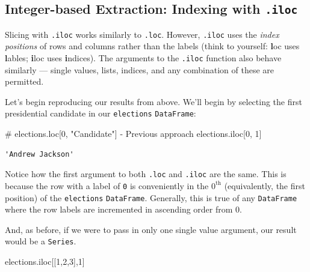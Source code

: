 \documentclass[
  letterpaper,
  DIV=11,
  numbers=noendperiod]{scrreprt}
\newenvironment{Shaded}{\begin{snugshade}}{\end{snugshade}}
\newcommand{\CommentTok}[1]{\textcolor[rgb]{0.37,0.37,0.37}{#1}}
\newcommand{\DecValTok}[1]{\textcolor[rgb]{0.68,0.00,0.00}{#1}}
\newcommand{\NormalTok}[1]{\textcolor[rgb]{0.00,0.23,0.31}{#1}}
\begin{document}
\hypertarget{integer-based-extraction-indexing-with-.iloc}{%
\subsection{\texorpdfstring{Integer-based Extraction: Indexing with
\texttt{.iloc}}{Integer-based Extraction: Indexing with .iloc}}\label{integer-based-extraction-indexing-with-.iloc}}

Slicing with \texttt{.iloc} works similarly to \texttt{.loc}. However,
\texttt{.iloc} uses the \emph{index positions} of rows and columns
rather than the labels (think to yourself: \textbf{l}oc uses
\textbf{l}ables; \textbf{i}loc uses \textbf{i}ndices). The arguments to
the \texttt{.iloc} function also behave similarly --- single values,
lists, indices, and any combination of these are permitted.

Let's begin reproducing our results from above. We'll begin by selecting
the first presidential candidate in our \texttt{elections}
\texttt{DataFrame}:

\begin{Shaded}
\begin{Highlighting}[]
\CommentTok{\# elections.loc[0, "Candidate"] {-} Previous approach}
\NormalTok{elections.iloc[}\DecValTok{0}\NormalTok{, }\DecValTok{1}\NormalTok{]}
\end{Highlighting}
\end{Shaded}

\begin{verbatim}
'Andrew Jackson'
\end{verbatim}

Notice how the first argument to both \texttt{.loc} and \texttt{.iloc}
are the same. This is because the row with a label of \texttt{0} is
conveniently in the \(0^{\text{th}}\) (equivalently, the first position)
of the \texttt{elections} \texttt{DataFrame}. Generally, this is true of
any \texttt{DataFrame} where the row labels are incremented in ascending
order from 0.

And, as before, if we were to pass in only one single value argument,
our result would be a \texttt{Series}.

\begin{Shaded}
\begin{Highlighting}[]
\NormalTok{elections.iloc[[}\DecValTok{1}\NormalTok{,}\DecValTok{2}\NormalTok{,}\DecValTok{3}\NormalTok{],}\DecValTok{1}\NormalTok{]}
\end{Highlighting}
\end{Shaded}
\end{document}
